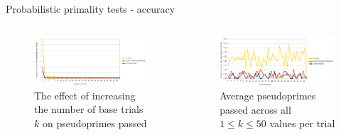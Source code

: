 \documentclass[pdf]{beamer}
\begin{document}
\begin{frame}{Probabilistic primality tests - accuracy}
    \begin{columns}[t, onlytextwidth]
        \begin{column}{0.48\textwidth}
            \begin{figure}
                \setcounter{figure}{0}
                \caption{The effect of increasing the number of base trials $k$ on pseudoprimes passed}
                \centering
                \includegraphics[width=\textwidth]{pprimes_v_bases}
            \end{figure}
        \end{column}
        \begin{column}{0.48\textwidth}
            \begin{figure}
                \setcounter{figure}{1}
                \caption{Average pseudoprimes passed across all $1 \leq k \leq 50$ values per trial}
                \centering
                \includegraphics[width=\textwidth]{pprimes_v_trial}
            \end{figure}
        \end{column}
    \end{columns}
    \begin{outline}
        \pause
        \pause
    \end{outline}
\end{frame}
\end{document}
